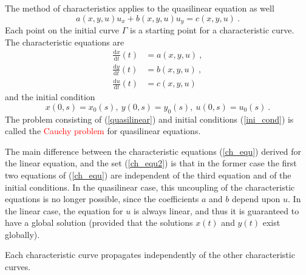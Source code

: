 \documentclass[12pt,a4paper]{article}
\newcommand{\dif}{\mathrm{d}}
\begin{document}
The method of characteristics applies to the quasilinear equation as well
\begin{equation}
a(x, y, u) u_x +b(x, y, u) u_y = c(x, y, u) ~.
\label{quasilinear}
\end{equation}
Each point on the initial curve $\Gamma$ is a starting point for a characteristic curve. The characteristic equations are
\begin{align}
\nonumber \frac{\dif x}{\dif t}(t) &= a(x, y, u) ~, \\
\nonumber \frac{\dif y}{\dif t}(t) &= b(x, y, u) ~, \\
\frac{\dif u}{\dif t}(t) &= c(x, y, u)
\label{ch_equ2}
\end{align}
and the initial condition
\begin{equation}
x(0, s) = x_0(s), ~y(0, s) = y_0(s), ~u(0, s) = u_0(s) ~.
\label{ini_cond}
\end{equation}
The problem consisting of (\ref{quasilinear}) and initial conditions (\ref{ini_cond}) is called the \textcolor{red}{Cauchy problem} for quasilinear equations.

The main difference between the characteristic equations (\ref{ch_equ}) derived for the linear equation, and the set (\ref{ch_equ2}) is that in the former case the first two equations of (\ref{ch_equ}) are independent of the third equation and of the initial conditions. In the quasilinear case, this uncoupling of the characteristic equations is no longer possible, since the coefficients $a$ and $b$ depend upon $u$. In the linear case, the equation for $u$ is always linear, and thus it is guaranteed to have a global solution (provided that the solutions $x(t)$ and $y(t)$ exist globally).

Each characteristic curve propagates independently of the other characteristic curves.
\end{document}
